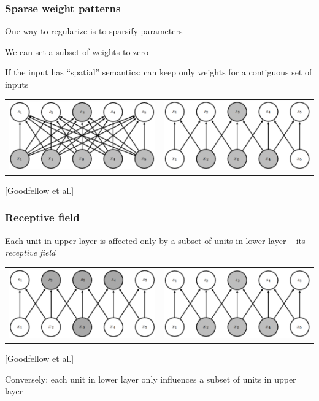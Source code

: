 \documentclass[xcolor=dvipsnames]{beamer}
\begin{document}
\begin{frame}
  \frametitle{Sparse weight patterns}
  \bi
\item One way to regularize is to sparsify parameters
\item We can set a subset of weights to zero
\item If the input has ``spatial'' semantics: can keep only weights
  for a contiguous set of inputs
\ei

\begin{tabular}[c]{cc}
  \includegraphics[width=.48\textwidth]{gcb-densenet-above-ill} &
  \includegraphics[width=.48\textwidth]{gcb-sparsenet-above-ill}
\end{tabular}
[Goodfellow et al.]

\end{frame}


\begin{frame}
  \frametitle{Receptive field}
  \bi
\item Each unit in upper layer is affected only by a subset of units
  in lower layer  -- its \emph{receptive field}
\ei

\begin{tabular}[c]{cc}
  \includegraphics[width=.48\textwidth]{gcb-densenet-ill} &
  \includegraphics[width=.48\textwidth]{gcb-sparsenet-above-ill}
\end{tabular}
[Goodfellow et al.]
\bi
\item Conversely: each unit in lower layer only influences a subset of
  units in upper layer
\ei
\end{frame}
\end{document}
